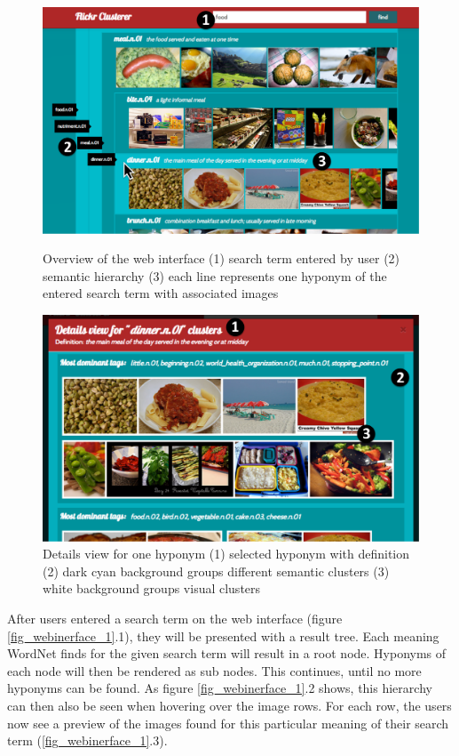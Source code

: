 \begin{figure}[!htb]
    \includegraphics[width=\linewidth]{images/webfrontend-screenshot_1.pdf}
    \caption{Overview of the web interface (1) search term entered by user (2) semantic hierarchy (3) each line represents one hyponym of the entered search term with associated images}\label{fig_webinerface_1}
  \endminipage\hfill
    \includegraphics[width=\linewidth]{images/webfrontend-screenshot_2.pdf}
    \caption{Details view for one hyponym (1) selected hyponym with definition (2) dark cyan background groups different semantic clusters (3) white background groups visual clusters}\label{fig_webinerface_2}
  \endminipage\hfill
\end{figure}

After users entered a search term on the web interface (figure \ref{fig_webinerface_1}.1), they will be presented with a result tree.
Each meaning WordNet finds for the given search term will result in a root node.
Hyponyms of each node will then be rendered as sub nodes.
This continues, until no more hyponyms can be found.
As figure \ref{fig_webinerface_1}.2 shows, this hierarchy can then also be seen when hovering over the image rows.
For each row, the users now see a preview of the images found for this particular meaning of their search term (\ref{fig_webinerface_1}.3). \\


